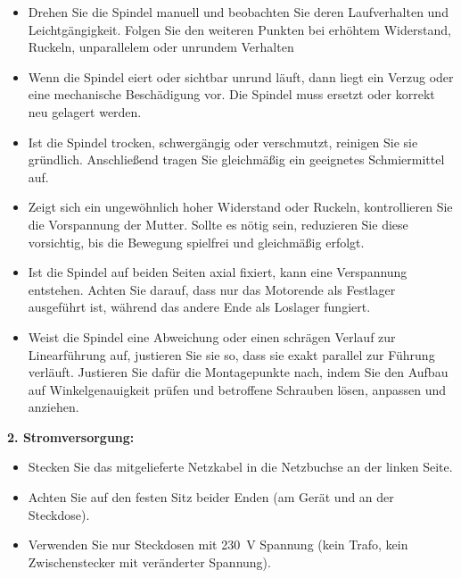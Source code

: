 \documentclass[a4paper,12pt]{report}
\begin{document}
	    \begin{itemize}[leftmargin=1.5em]
		
		\item Drehen Sie die Spindel manuell und beobachten Sie deren Laufverhalten und Leichtgängigkeit. Folgen Sie den weiteren Punkten bei erhöhtem Widerstand, Ruckeln, unparallelem oder unrundem Verhalten 
		
		\item Wenn die Spindel eiert oder sichtbar unrund läuft, dann liegt ein Verzug oder eine mechanische Beschädigung vor. Die Spindel muss ersetzt oder korrekt neu gelagert werden.
		
		\item Ist die Spindel trocken, schwergängig oder verschmutzt, reinigen Sie sie gründlich. Anschließend tragen Sie gleichmäßig ein geeignetes Schmiermittel auf. 
		
		\item Zeigt sich ein ungewöhnlich hoher Widerstand oder Ruckeln, kontrollieren Sie die Vorspannung der Mutter. Sollte es nötig sein, reduzieren Sie diese vorsichtig, bis die Bewegung spielfrei und gleichmäßig erfolgt. 
		
		\item Ist die Spindel auf beiden Seiten axial fixiert, kann eine Verspannung entstehen. Achten Sie darauf, dass nur das Motorende als Festlager ausgeführt ist, während das andere Ende als Loslager fungiert.
		
		\item Weist die Spindel eine Abweichung oder einen schrägen Verlauf zur Linearführung auf, justieren Sie sie so, dass sie exakt parallel zur Führung verläuft. Justieren Sie dafür die Montagepunkte nach, indem Sie den Aufbau auf Winkelgenauigkeit prüfen und betroffene Schrauben lösen, anpassen und anziehen.\\ 
	    \end{itemize}
		
		
		\noindent\textbf{2. Stromversorgung:}
		
		\begin{itemize}[leftmargin=1.5em]
		
		\item Stecken Sie das mitgelieferte Netzkabel in die Netzbuchse an der linken Seite. 
		\item Achten Sie auf den festen Sitz beider Enden (am Gerät und an der Steckdose). 
		\item Verwenden Sie nur Steckdosen mit 230\ V Spannung (kein Trafo, kein Zwischenstecker mit veränderter Spannung). \\
    	\end{itemize}
		
\end{document}

